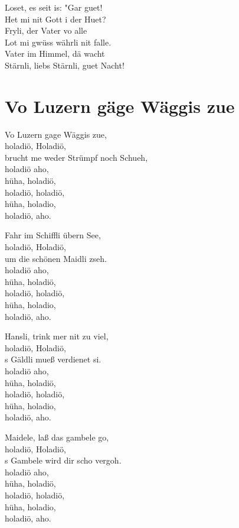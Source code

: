 \documentclass[
  letterpaper,
]{scrbook}
\begin{document}
Loset, es seit is: "Gar guet!\\
Het mi nit Gott i der Huet?\\
Fryli, der Vater vo alle\\
Lot mi gwüss währli nit falle.\\
Vater im Himmel, dä wacht\\
Stärnli, liebs Stärnli, guet Nacht!

\hypertarget{vo-luzern-guxe4ge-wuxe4ggis-zue}{%
\chapter{Vo Luzern gäge Wäggis
zue}\label{vo-luzern-guxe4ge-wuxe4ggis-zue}}

Vo Luzern gage Wäggis zue,\\
holadiö, Holadiö,\\
brucht me weder Strümpf noch Schueh,\\
holadiö aho,\\
hüha, holadiö,\\
holadiö, holadiö,\\
hüha, holadio,\\
holadiö, aho.

Fahr im Schiffli übern See,\\
holadiö, Holadiö,\\
um die schönen Maidli zseh.\\
holadiö aho,\\
hüha, holadiö,\\
holadiö, holadiö,\\
hüha, holadio,\\
holadiö, aho.

Hansli, trink mer nit zu viel,\\
holadiö, Holadiö,\\
\textquotesingle s Gäldli mueß verdienet si.\\
holadiö aho,\\
hüha, holadiö,\\
holadiö, holadiö,\\
hüha, holadio,\\
holadiö, aho.

Maidele, laß das gambele go,\\
holadiö, Holadiö,\\
\textquotesingle s Gambele wird dir scho vergoh.\\
holadiö aho,\\
hüha, holadiö,\\
holadiö, holadiö,\\
hüha, holadio,\\
holadiö, aho.
\end{document}
